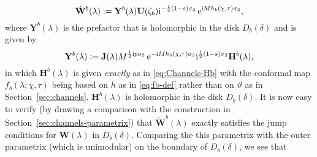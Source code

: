 \begin{equation}
\dot{\mathbf{W}}^b(\lambda)\defeq \mathbf{Y}^b(\lambda)\mathbf{U}(\zeta_b) \ii^{-\frac{1}{2}(1-s)\sigma_3} \ee^{\ii M{h}_b(\chi,\tau)\sigma_3},%
\end{equation}
where $\mathbf{Y}^b(\lambda)$ is the prefactor that is holomorphic in the disk $D_b(\delta)$ and is given by
\begin{equation}
\mathbf{Y}^b(\lambda)\vcentcolon= 
\mathbf{J}(\lambda)
M^{\frac{1}{2} \mathrm{i} p \sigma_3}
 \,\mathrm{e}^{-\mathrm{i} M {h}_b(\chi,\tau)\sigma_3} \mathrm{i}^{\frac{1}{2}(1-s)\sigma_3}  \mathbf{H}^{b}(\lambda),
\label{eq:A-b}
\end{equation}
in which $\mathbf{H}^b(\lambda)$ is given \emph{exactly} as in \eqref{eq:Channels-Hb} with the conformal map $f_b(\lambda;\chi,\tau)$ being based on $h$ as in \eqref{eq:fb-def} rather than on $\vartheta$ as in Section~\ref{sec:channels}. $\mathbf{H}^b(\lambda)$ is holomorphic in the disk $D_b(\delta)$.
It is now easy to verify (by drawing a comparison with the construction in Section~\ref{sec:channels-parametrix}) that $\dot{\mathbf{W}}^b(\lambda)$ exactly satisfies the jump conditions for $\mathbf{W}(\lambda)$ in $D_b(\delta)$.
Comparing the this parametrix with the outer parametrix (which is unimodular) on the boundary of $D_b(\delta)$, we see that
